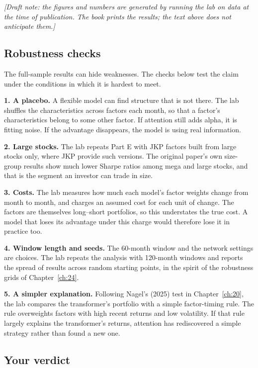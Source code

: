 \emph{[Draft note: the figures and numbers are generated by running the lab on data at the time of publication. The book prints the results; the text above does not anticipate them.]}

\subsection{Robustness checks}
\label{sec:22-stress}

The full-sample results can hide weaknesses. The checks below test the claim under the conditions in which it is hardest to meet.

\textbf{1. A placebo.} A flexible model can find structure that is not there. The lab shuffles the characteristics across factors each month, so that a factor's characteristics belong to some other factor. If attention still adds alpha, it is fitting noise. If the advantage disappears, the model is using real information.

\textbf{2. Large stocks.} The lab repeats Part E with JKP factors built from large stocks only, where JKP provide such versions. The original paper's own size-group results show much lower Sharpe ratios among mega and large stocks, and that is the segment an investor can trade in size.

\textbf{3. Costs.} The lab measures how much each model's factor weights change from month to month, and charges an assumed cost for each unit of change. The factors are themselves long--short portfolios, so this understates the true cost. A model that loses its advantage under this charge would therefore lose it in practice too.

\textbf{4. Window length and seeds.} The 60-month window and the network settings are choices. The lab repeats the analysis with 120-month windows and reports the spread of results across random starting points, in the spirit of the robustness grids of Chapter~\ref{ch:24}.

\textbf{5. A simpler explanation.} Following Nagel's (2025) test in Chapter~\ref{ch:20}, the lab compares the transformer's portfolio with a simple factor-timing rule. The rule overweights factors with high recent returns and low volatility. If that rule largely explains the transformer's returns, attention has rediscovered a simple strategy rather than found a new one.

\subsection*{Your verdict}

